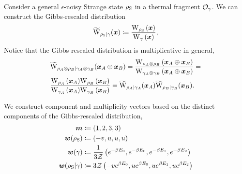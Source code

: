 \documentclass[pra,
aps,
twocolumn,
superscriptaddress,
groupedaddress,
nofootinbib,
reprint
]{revtex4-1}
\begin{document}
Consider a general $\epsilon$-noisy Strange state $\rho_{\rm{S}}$ in a thermal fragment $\mathcal{O}_{\gamma}$.
We can construct the Gibbs-rescaled distribution 
\begin{equation}
	\widetilde{\rm{W}}_{\rho_{\rm{S}}|\gamma}(\bmx) \coloneqq \frac{\W[\bmx]{\rho_{\rm{S}}}}{\W[\bmx]{\gamma}},
\end{equation}
Notice that the Gibbs-rescaled distribution is multiplicative in general,
\begin{align}
	&\widetilde{\rm{W}}_{\rho_A \otimes \rho_B | \gamma_A \otimes \gamma_B}(\bmx_A \oplus \bmx_B) = \frac{\W[\bmx_A \oplus \bmx_B]{\rho_A \otimes \rho_B}}{\W[\bmx_A \oplus \bmx_B]{\gamma_A \otimes \gamma_B}} = \nonumber \\
	&\frac{\W[\bmx_A]{\rho_A}\W[\bmx_B]{\rho_B}}{\W[\bmx_A]{\gamma_A}\W[\bmx_B]{\gamma_B}} = \widetilde{\rm{W}}_{\rho_A | \gamma_A}(\bmx_A)\widetilde{\rm{W}}_{\rho_B  | \gamma_B}(\bmx_B).
\end{align}

We construct component and multiplicity vectors based on the distinct components of the Gibbs-rescaled distribution,
\begin{align}
	\bm{m} &\coloneqq (1,2,3,3) \\
	\bm{w}(\rho_{\rm{S}}) &\coloneqq (-v, u, u, u) \\
	\bm{w}(\gamma) &\coloneqq \frac{1}{3\mathcal{Z}} \left( e^{-\beta E_0}, e^{-\beta E_0}, e^{-\beta E_1}, e^{-\beta E_2} \right) \\
	\bm{w}(\rho_{\rm{S}} | \gamma) &\coloneqq 3\mathcal{Z} \left( -v e^{\beta E_0}, u e^{\beta E_0}, u e^{\beta E_1}, u e^{\beta E_2} \right) \label{eq:bmw_rescaled}
\end{align}
\end{document}
